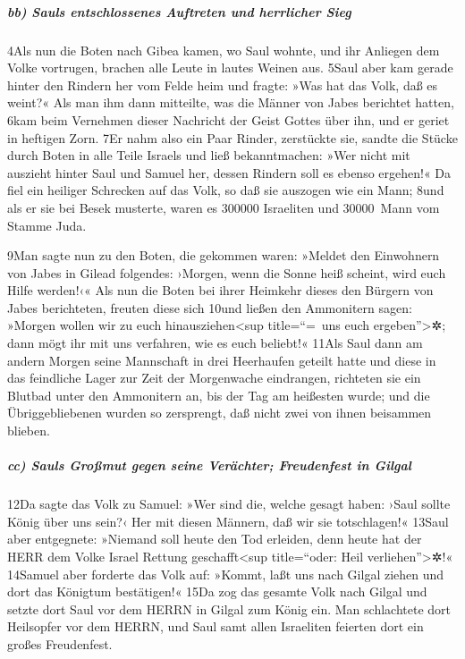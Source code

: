 \hypertarget{bb-sauls-entschlossenes-auftreten-und-herrlicher-sieg}{%
\subparagraph{bb) Sauls entschlossenes Auftreten und herrlicher
Sieg}\label{bb-sauls-entschlossenes-auftreten-und-herrlicher-sieg}}

4Als nun die Boten nach Gibea kamen, wo Saul wohnte, und ihr Anliegen
dem Volke vortrugen, brachen alle Leute in lautes Weinen aus. 5Saul aber
kam gerade hinter den Rindern her vom Felde heim und fragte: »Was hat
das Volk, daß es weint?« Als man ihm dann mitteilte, was die Männer von
Jabes berichtet hatten, 6kam beim Vernehmen dieser Nachricht der Geist
Gottes über ihn, und er geriet in heftigen Zorn. 7Er nahm also ein Paar
Rinder, zerstückte sie, sandte die Stücke durch Boten in alle Teile
Israels und ließ bekanntmachen: »Wer nicht mit auszieht hinter Saul und
Samuel her, dessen Rindern soll es ebenso ergehen!« Da fiel ein heiliger
Schrecken auf das Volk, so daß sie auszogen wie ein Mann; 8und als er
sie bei Besek musterte, waren es 300000 Israeliten und 30000~Mann vom
Stamme Juda.

9Man sagte nun zu den Boten, die gekommen waren: »Meldet den Einwohnern
von Jabes in Gilead folgendes: ›Morgen, wenn die Sonne heiß scheint,
wird euch Hilfe werden!‹« Als nun die Boten bei ihrer Heimkehr dieses
den Bürgern von Jabes berichteten, freuten diese sich 10und ließen den
Ammonitern sagen: »Morgen wollen wir zu euch hinausziehen\textless sup
title=``=~uns euch ergeben''\textgreater✲; dann mögt ihr mit uns
verfahren, wie es euch beliebt!« 11Als Saul dann am andern Morgen seine
Mannschaft in drei Heerhaufen geteilt hatte und diese in das feindliche
Lager zur Zeit der Morgenwache eindrangen, richteten sie ein Blutbad
unter den Ammonitern an, bis der Tag am heißesten wurde; und die
Übriggebliebenen wurden so zersprengt, daß nicht zwei von ihnen
beisammen blieben.

\hypertarget{cc-sauls-grouxdfmut-gegen-seine-veruxe4chter-freudenfest-in-gilgal}{%
\subparagraph{cc) Sauls Großmut gegen seine Verächter; Freudenfest in
Gilgal}\label{cc-sauls-grouxdfmut-gegen-seine-veruxe4chter-freudenfest-in-gilgal}}

12Da sagte das Volk zu Samuel: »Wer sind die, welche gesagt haben: ›Saul
sollte König über uns sein?‹ Her mit diesen Männern, daß wir sie
totschlagen!« 13Saul aber entgegnete: »Niemand soll heute den Tod
erleiden, denn heute hat der HERR dem Volke Israel Rettung
geschafft\textless sup title=``oder: Heil verliehen''\textgreater✲!«
14Samuel aber forderte das Volk auf: »Kommt, laßt uns nach Gilgal ziehen
und dort das Königtum bestätigen!« 15Da zog das gesamte Volk nach Gilgal
und setzte dort Saul vor dem HERRN in Gilgal zum König ein. Man
schlachtete dort Heilsopfer vor dem HERRN, und Saul samt allen
Israeliten feierten dort ein großes Freudenfest.

